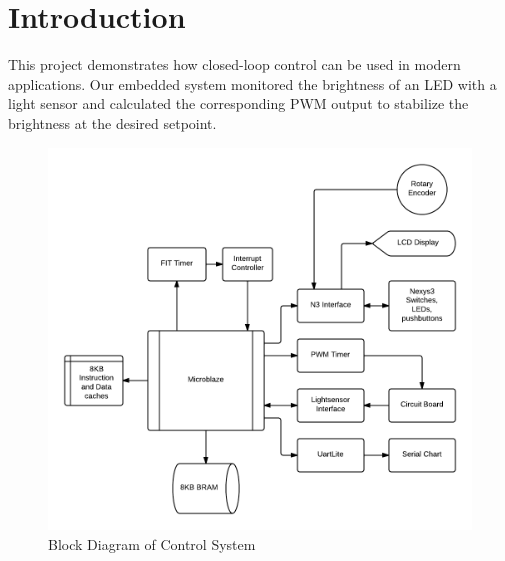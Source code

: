 \documentclass[11pt]{article}
\begin{document}




\section{Introduction} 
This project demonstrates how closed-loop control can be used in modern applications.  Our embedded system monitored the brightness of an LED with a light sensor and calculated the corresponding PWM output to stabilize the brightness at the desired setpoint.

	\begin{figure}[h]\centering
	\includegraphics[height=0.7\textwidth]{images/block_diagram.png}
	\caption{Block Diagram of Control System}
		\label{diagram}
	\end{figure}
\end{document}
